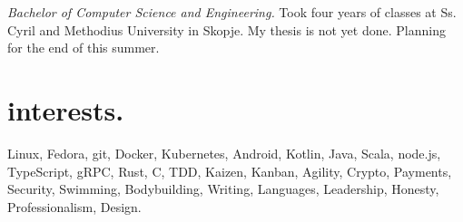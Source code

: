 \documentclass[a4paper,notitlepage]{report}
\begin{document}
\emph{Bachelor of Computer Science and Engineering.} Took four years of classes
at Ss. Cyril and Methodius University in Skopje. My thesis is not yet done.
Planning for the end of this summer.

\section*{interests.}

\small Linux, Fedora, git, Docker, Kubernetes, Android, Kotlin, Java, Scala,
node.js, TypeScript, gRPC, Rust, C, TDD, Kaizen, Kanban, Agility, Crypto, Payments, 
Security, Swimming, Bodybuilding, Writing, Languages, Leadership, 
Honesty, Professionalism, Design.
\end{document}
